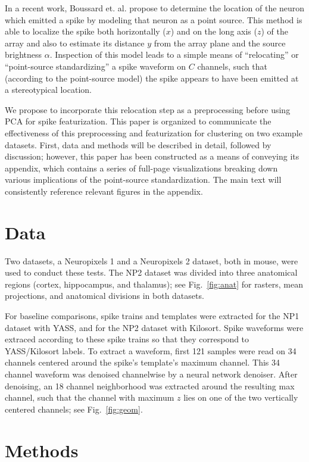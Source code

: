 \documentclass[
  12pt,
]{article}
\theoremstyle{plain}
\theoremstyle{definition}
\theoremstyle{remark}
\newcommand{\1}[1]{\mathbb{1}_{{#1}}}
\begin{document}
In a recent work, Boussard et. al. \cite{boussard} propose to determine the location of the neuron which emitted a spike by modeling that neuron as a point source. This method is able to localize the spike both horizontally ($x$) and on the long axis ($z$) of the array and also to estimate its distance $y$ from the array plane and the source brightness $\alpha$. Inspection of this model leads to a simple means of ``relocating'' or ``point-source standardizing'' a spike waveform on $C$ channels, such that (according to the point-source model) the spike appears to have been emitted at a stereotypical location.

We propose to incorporate this relocation step as a preprocessing before using PCA for spike featurization. This paper is organized to communicate the effectiveness of this preprocessing and featurization for clustering on two example datasets. First, data and methods will be described in detail, followed by discussion; however, this paper has been constructed as a means of conveying its appendix, which contains a series of full-page visualizations breaking down various implications of the point-source standardization. The main text will consistently reference relevant figures in the appendix.


\section{Data}

Two datasets, a Neuropixels 1 and a Neuropixels 2 dataset, both in mouse, were used to conduct these tests. The NP2 dataset was divided into three anatomical regions (cortex, hippocampus, and thalamus); see Fig.~\ref{fig:anat} for rasters, mean projections, and anatomical divisions in both datasets.

For baseline comparisons, spike trains and templates were extracted for the NP1 dataset with YASS, and for the NP2 dataset with Kilosort. Spike waveforms were extraced according to these spike trains so that they correspond to YASS/Kilosort labels. To extract a waveform, first 121 samples were read on 34 channels centered around the spike's template's maximum channel. This 34 channel waveform was denoised channelwise by a neural network denoiser. After denoising, an 18 channel neighborhood was extracted around the resulting max channel, such that the channel with maximum $z$ lies on one of the two vertically centered channels; see Fig.~\ref{fig:geom}.

\section{Methods}
\end{document}
